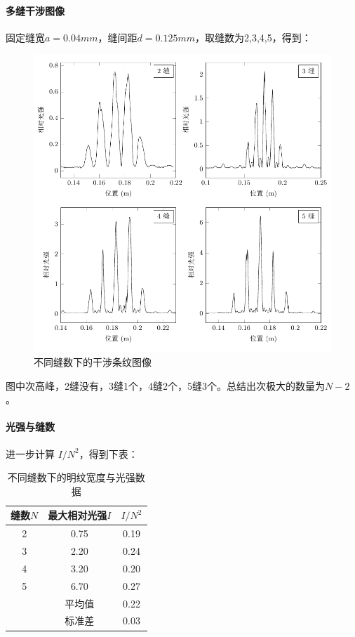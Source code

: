 \documentclass[a4paper]{../phyreport}
\begin{document}
\paragraph{多缝干涉图像}
固定缝宽$a=0.04mm$，缝间距$d= 0.125mm$，取缝数为2,3,4,5，得到：
\begin{figure}[H]
  \centering
  \includegraphics[]{fig/多缝/多缝2345tikz.pdf}
  \caption{不同缝数下的干涉条纹图像} \label{缝数}
\end{figure}

图中次高峰，2缝没有，3缝1个，4缝2个，5缝3个。总结出次极大的数量为$N-2$。

\paragraph{光强与缝数} 进一步计算 $I / N^2$，得到下表：
\begin{table}[H]
  \centering
  \caption{不同缝数下的明纹宽度与光强数据}
    \begin{tabular}{ccc}
      \toprule
      缝数$N$  & 最大相对光强$I$ & $I / N^2$ \\
      \midrule
      2  & 0.75  & 0.19  \\
      3  & 2.20  & 0.24  \\
      4  & 3.20  & 0.20  \\
      5  & 6.70  & 0.27  \\
      \midrule
      & 平均值   & 0.22  \\
      & 标准差   & 0.03  \\
      \bottomrule
    \end{tabular}
  \label{tab:不同缝数下的明纹宽度与光强数据}
\end{table}
\end{document}
